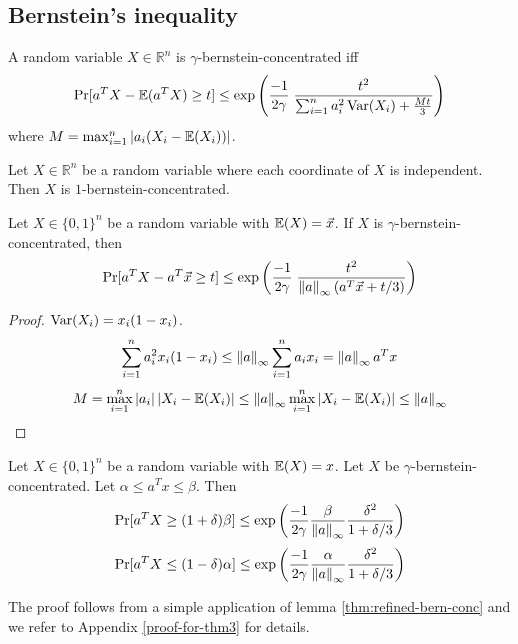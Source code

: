 \subsection{Bernstein's inequality}

\begin{definition}
A random variable $X \in \mathbb{R}^n$ is $\gamma$-bernstein-concentrated iff
\[ \Pr[a^TX - \operatorname{\mathbb{E}}(a^TX) \ge t]
\le \exp\left( \frac{-1}{2\gamma} \; \frac{t^2}{\sum_{i=1}^n a_i^2 \operatorname*{Var}(X_i) + \frac{Mt}{3}} \right) \]
where $M = \max_{i=1}^n \left\lvert a_i(X_i - \operatorname{\mathbb{E}}(X_i)) \right\rvert$.
\end{definition}

\begin{theorem}
Let $X \in \mathbb{R}^n$ be a random variable where each coordinate of $X$ is independent.
Then $X$ is $1$-bernstein-concentrated.
\end{theorem}

\begin{lemma}
\label{thm:refined-bern-conc}
Let $X \in \{0, 1\}^n$ be a random variable with $\operatorname{\mathbb{E}}(X) = \vec{x}$.
If $X$ is $\gamma$-bernstein-concentrated, then
\[ \Pr[a^TX - a^T\vec{x} \ge t]
\le \exp\left( \frac{-1}{2\gamma} \; \frac{t^2}{\left\lVert a \right\rVert_{\infty}(a^T\vec{x} + t/3)} \right) \]
\end{lemma}
\begin{proof}
$\operatorname*{Var}(X_i) = x_i(1-x_i)$.
\[ \sum_{i=1}^n a_i^2 x_i(1-x_i)
\le \left\lVert a \right\rVert_{\infty} \sum_{i=1}^n a_ix_i
= \left\lVert a \right\rVert_{\infty} a^Tx \]
\[ M = \max_{i=1}^n \left\lvert a_i \right\rvert\left\lvert X_i - \operatorname{\mathbb{E}}(X_i) \right\rvert
\le \left\lVert a \right\rVert_{\infty} \max_{i=1}^n \left\lvert X_i - \operatorname{\mathbb{E}}(X_i) \right\rvert
\le \left\lVert a \right\rVert_{\infty} \]
\end{proof}

\begin{theorem}
\label{thm:lin-bound-bern-conc}
Let $X \in \{0, 1\}^n$ be a random variable with $\operatorname{\mathbb{E}}(X) = x$.
Let $X$ be $\gamma$-bernstein-concentrated.
Let $\alpha \le a^Tx \le \beta$. Then
\[ \Pr[ a^TX \ge (1+\delta)\beta ]
\le \exp\left(\frac{-1}{2\gamma} \frac{\beta}{\left\lVert a \right\rVert_{\infty}} \frac{\delta^2}{1+\delta/3} \right) \]
\[ \Pr[ a^TX \le (1-\delta)\alpha ]
\le \exp\left(\frac{-1}{2\gamma} \frac{\alpha}{\left\lVert a \right\rVert_{\infty}} \frac{\delta^2}{1+\delta/3} \right) \]
\end{theorem}
The proof follows from a simple application of lemma \ref{thm:refined-bern-conc}
and we refer to Appendix \ref{proof-for-thm3} for details.
